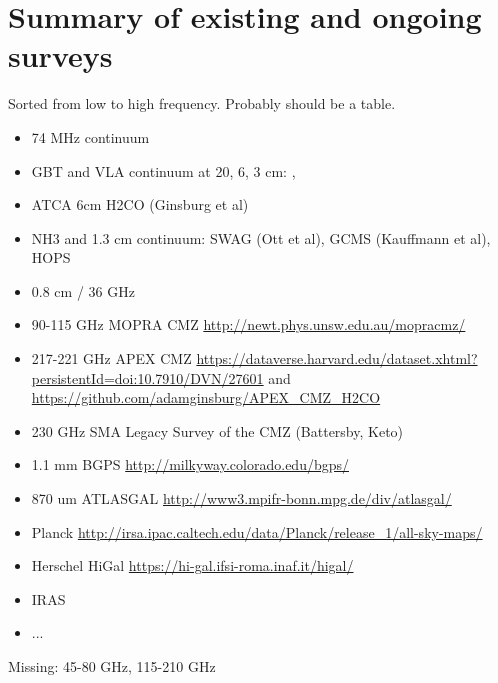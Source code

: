 \section{Summary of existing and ongoing surveys}
Sorted from low to high frequency.  Probably should be a table.

\begin{itemize}
    \item 74 MHz continuum \citep{Yusef-Zadeh2013c}
    \item GBT and VLA continuum at 20, 6, 3 cm: \citet{Law2008a}, \citet{Law2008b}
    \item ATCA 6cm H2CO (Ginsburg et al)
    \item NH3 and 1.3 cm continuum: SWAG (Ott et al), GCMS (Kauffmann et al), HOPS \citep{Walsh2011a}
    \item 0.8 cm / 36 GHz \citep{Yusef-Zadeh2013a}
    \item 90-115 GHz MOPRA CMZ \url{http://newt.phys.unsw.edu.au/mopracmz/} \citep{Jones2012a}
    \item 217-221 GHz APEX CMZ \url{https://dataverse.harvard.edu/dataset.xhtml?persistentId=doi:10.7910/DVN/27601} and \url{https://github.com/adamginsburg/APEX_CMZ_H2CO}
    \item 230 GHz SMA Legacy Survey of the CMZ (Battersby, Keto)
    \item 1.1 mm BGPS \url{http://milkyway.colorado.edu/bgps/}
    \item 870 um ATLASGAL \url{http://www3.mpifr-bonn.mpg.de/div/atlasgal/}
    \item Planck \url{http://irsa.ipac.caltech.edu/data/Planck/release_1/all-sky-maps/}
    \item Herschel HiGal \url{https://hi-gal.ifsi-roma.inaf.it/higal/}
    \item IRAS
    \item ...
    
\end{itemize}

Missing: 45-80 GHz, 115-210 GHz